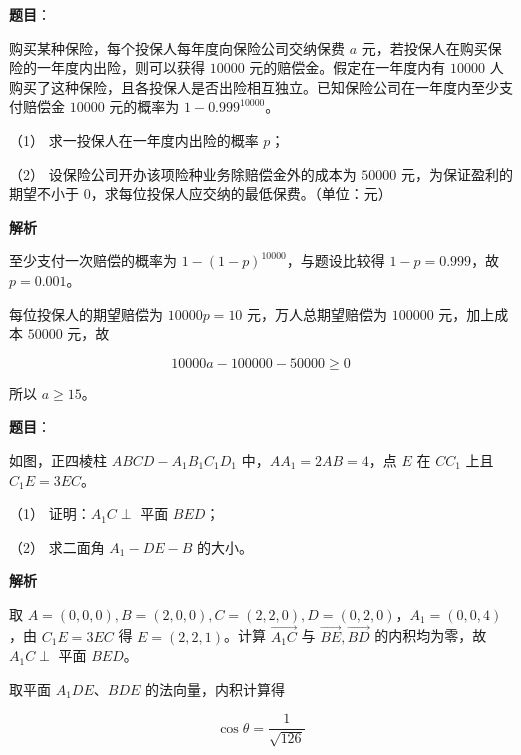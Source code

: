 \begin{answer}

\textbf{题目}：

购买某种保险，每个投保人每年度向保险公司交纳保费 $a$ 元，若投保人在购买保险的一年度内出险，则可以获得 $10000$ 元的赔偿金。假定在一年度内有 $10000$ 人购买了这种保险，且各投保人是否出险相互独立。已知保险公司在一年度内至少支付赔偿金 $10000$ 元的概率为 $1-0.999^{10000}$。

（1） 求一投保人在一年度内出险的概率 $p$；

（2） 设保险公司开办该项险种业务除赔偿金外的成本为 $50000$ 元，为保证盈利的期望不小于 $0$，求每位投保人应交纳的最低保费。（单位：元）

\textbf{解析}


至少支付一次赔偿的概率为 $1-(1-p)^{10000}$，与题设比较得 $1-p=0.999$，故 $p=0.001$。


每位投保人的期望赔偿为 $10000p=10$ 元，万人总期望赔偿为 $100000$ 元，加上成本 $50000$ 元，故

\nopagebreak[4]
\[
10000a-100000-50000\geqslant0
\]

所以 $a\geqslant15$。



\end{answer}
\begin{answer}

\textbf{题目}：

如图，正四棱柱 $ABCD-A_1B_1C_1D_1$ 中，$AA_1=2AB=4$，点 $E$ 在 $CC_1$ 上且 $C_1E=3EC$。
\nopagebreak[4]
\begin{center}\end{center}
\nopagebreak[4]
（1） 证明：$A_1C\perp$ 平面 $BED$；

（2） 求二面角 $A_1-DE-B$ 的大小。

\textbf{解析}


取 $A=(0,0,0),B=(2,0,0),C=(2,2,0),D=(0,2,0)$，$A_1=(0,0,4)$，由 $C_1E=3EC$ 得 $E=(2,2,1)$。计算 $\overrightarrow{A_1C}$ 与 $\overrightarrow{BE},\overrightarrow{BD}$ 的内积均为零，故 $A_1C\perp$ 平面 $BED$。


取平面 $A_1DE$、$BDE$ 的法向量，内积计算得

\nopagebreak[4]
\[
\cos\theta=\frac1{\sqrt{126}}
\]



\end{answer}
